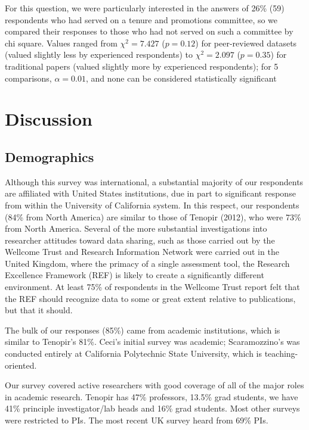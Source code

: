 \documentclass[10pt]{article}
\begin{document}
For this question, we were particularly interested in the answers of 26\% (59) respondents who had served on a tenure and promotions committee, so we compared their responses to those who had not served on such a committee by chi square.
Values ranged from $\chi^{2}= 7.427$ ($p= 0.12$) for peer-reviewed datasets (valued slightly less by experienced respondents) to $\chi^{2}= 2.097$ ($p= 0.35$) for traditional papers (valued slightly more by experienced respondents); for 5 comparisons, $\alpha=0.01$, and none can be considered statistically significant


\section*{Discussion}

\subsection*{Demographics}

Although this survey was international, a substantial majority of our respondents are affiliated with United States institutions, due in part to significant response from within the University of California system.
In this respect, our respondents (84\% from North America) are similar to those of Tenopir (2012), who were 73\% from North America.
Several of the more substantial investigations into researcher attitudes toward data sharing, such as those carried out by the Wellcome Trust\cite{bobrow_establishing_2014} and Research Information Network\cite{swan_share_2008} were carried out in the United Kingdom, where the primacy of a single assessment tool, the Research Excellence Framework (REF) is likely to create a significantly different environment.
At least 75\% of respondents in the Wellcome Trust report felt that the REF should recognize data to some or great extent relative to publications, but that it should.

The bulk of our responses (85\%) came from academic institutions, which is similar to Tenopir's 81\%.  
Ceci's initial survey was academic\cite{ceci_scientists_1988}; Scaramozzino's was conducted entirely at California Polytechnic State University, which is teaching-oriented\cite{scaramozzino_study_2012}. 

Our survey covered active researchers with good coverage of all of the major roles in academic research.
Tenopir has 47\% professors, 13.5\% grad students, we have 41\% principle investigator/lab heads and 16\% grad students.
Most other surveys were restricted to PIs.
The most recent UK survey heard from 69\% PIs\cite{bobrow_establishing_2014}.
\end{document}
